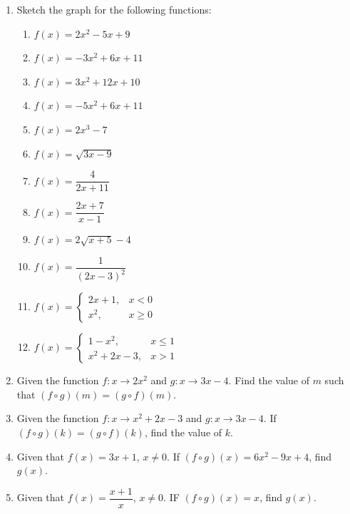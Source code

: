 \documentclass[12pt]{report}
\begin{document}
\begin{multicols}{2}
\begin{enumerate}
    \item Sketch the graph for the following functions:
          \begin{enumerate}
            \item $f(x) = 2x^2 - 5x + 9$
            \item $f(x) = -3x^2 + 6x + 11$
            \item $f(x) = 3x^2 + 12x + 10$
            \item $f(x) = -5x^2 + 6x + 11$
            \item $f(x) = 2x^3 - 7$
            \item $f(x) = \sqrt{3x - 9}$
            \item $f(x) = \dfrac{4}{2x+11}$
            \item $f(x) = \dfrac{2x + 7}{x-1}$
            \item $f(x) = 2\sqrt{x+5} - 4$
            \item $f(x) = \dfrac{1}{(2x - 3)^2}$
            \item $f(x) = \left\{\begin{array}{rl}
                      2x + 1, & x < 0    \\
                      x^2,    & x \geq 0
                    \end{array}\right.$
            \item $f(x) = \left\{\begin{array}{rl}
                      1 - x^2,      & x \leq 1 \\
                      x^2 + 2x - 3, & x > 1
                    \end{array}\right.$
          \end{enumerate}

    \item Given the function $f:x \to 2x^2$ and $g:x \to 3x - 4$. Find the value of $m$
          such that $(f \circ g)(m) = (g \circ f)(m)$.

    \item Given the function $f:x \to x^2 + 2x - 3$ and $g:x \to 3x - 4$. If $(f \circ
            g)(k) = (g \circ f)(k)$, find the value of $k$.

    \item Given that $f(x) = 3x + 1$, $x \neq 0$. If $(f \circ g)(x) = 6x^2 - 9x + 4$,
          find $g(x)$.

    \item Given that $f(x) = \dfrac{x+1}{x}$, $x \neq 0$. IF $(f \circ g)(x) = x$, find
          $g(x)$.


\end{enumerate}
\end{multicols}
\end{document}

